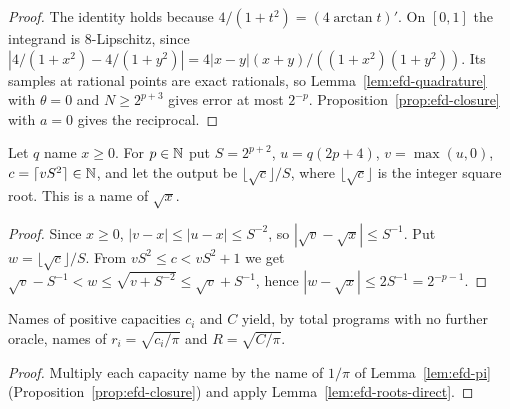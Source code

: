 \begin{proof}
The identity holds because $4/(1+t^2)=(4\arctan t)'$. On $[0,1]$ the integrand is $8$-Lipschitz, since $|4/(1+x^2)-4/(1+y^2)|=4|x-y|(x+y)/((1+x^2)(1+y^2))$. Its samples at rational points are exact rationals, so Lemma~\ref{lem:efd-quadrature} with $\theta=0$ and $N\ge2^{p+3}$ gives error at most $2^{-p}$. Proposition~\ref{prop:efd-closure} with $a=0$ gives the reciprocal.
\end{proof}

\begin{lemma}\label{lem:efd-roots-direct}
Let $q$ name $x\ge0$. For $p\in\mathbb{N}$ put $S=2^{p+2}$, $u=q(2p+4)$, $v=\max(u,0)$, $c=\lceil vS^2\rceil\in\mathbb{N}$, and
let the output be $\lfloor\sqrt c\rfloor/S$, where $\lfloor\sqrt c\rfloor$ is the integer square root. This is a name
of $\sqrt x$.
\end{lemma}

\begin{proof}
Since $x\ge0$, $|v-x|\le|u-x|\le S^{-2}$, so $|\sqrt v-\sqrt x|\le S^{-1}$. Put $w=\lfloor\sqrt c\rfloor/S$. From $vS^2\le c<vS^2+1$ we get $\sqrt v-S^{-1}<w\le\sqrt{v+S^{-2}}\le\sqrt v+S^{-1}$, hence $|w-\sqrt x|\le2S^{-1}=2^{-p-1}$.
\end{proof}

\begin{corollary}\label{thm:efd-radii}
Names of positive capacities $c_i$ and $C$ yield, by total programs with no further oracle, names of
$r_i=\sqrt{c_i/\pi}$ and $R=\sqrt{C/\pi}$.
\end{corollary}

\begin{proof}
Multiply each capacity name by the name of $1/\pi$ of Lemma~\ref{lem:efd-pi} (Proposition~\ref{prop:efd-closure}) and apply Lemma~\ref{lem:efd-roots-direct}.
\end{proof}
